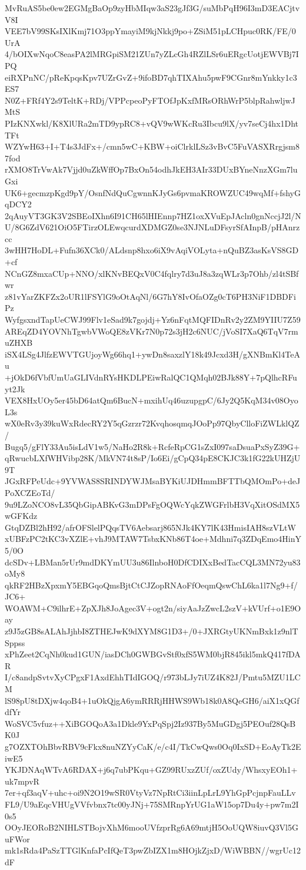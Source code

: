 MvRuAS5be0ew2EGMgBaOp9zyHbMIqw3aS23gJf3G/suMbPqH96I3mD3EACjtvV8I
VEE7bV99SKsIXlKmj71O3ppYmayiM9kjNkkj9po+ZSiM51pLCHpuc0RK/FE/0UrA
4/bOIXwNqoC8easPA2lMRGpiSM21ZUn7yZLcGh4RZlLSr6uERgcUotjEWVBj7IPQ
eiRXPnNC/pReKpqsKpv7UZrGvZ+9ifoBD7qhTIXAhu5pwF9CGnr8mYnkky1c3ES7
N0Z+FRf4Y2s9TeltK+RDj/VPPcpeoPyFTOfJpKxfMRsORhWrP5blpRahwljwJMtS
PIzKNXwkl/K8XlURa2mTD9ypRC8+vQV9wWKcRu3Ibcu9lX/yv7seCj4hx1DhtTFt
WZYwH63+I+T4s3JdFx+/cmn5wC+KBW+oiClrklLSz3vBvC5FuVASXRrgjsm87fod
rXMO8TrVwAk7Vjjd0uZkWffOp7BxOn54odhJkEH3AIr33DUxBYneNnzXGm7luGxi
UK6+gecmzpKgd9pY/OsnfNdQuCgwnnKJyGs6pvmaKROWZUC49wqMf+fshyGqDCY2
2qAuyVT3GK3V2SBEoIXhn6I91CH65lHIEnnp7HZ1oxXVuEpJAcln0gnNccjJ2l/N
U/8G6ZdV621OiO5FTirzOLEwqcurdXDMGZ0se3NJNLuDFsyrSfAInpB/pHAnrzcc
3wHH7HoDL+Fufn36XCk0/ALdsnp8hxo6iX9vAqiVOLyta+nQuBZ3asKsVS8GD+cf
NCnGZ8mxaCUp+NNO/xlKNvBEQxV0C4fqlry7d3uJ8a3zqWLr3p7Ohb/zl4tSBfwr
z81vYarZKFZx2oUR1lFSYlG9oOtAqNl/6G7hY8IvOfaOZg0cT6PH3NiF1DBDFiPz
WyfgsxndTapUeCWJ99Flv1eSad9k7gojdj+Yz6nFqtMQFIDnRv2y2ZM9YIIU7Z59
AREqZD4YOVNhTgwbVWoQE8zVKr7N0p72s3jH2c6NUC/jVoSI7XaQ6TqV7rmuZHXB
iSX4LSg4JlfzEWVTGUjoyWg66hq1+ywDn8saxzlY18k49Jcxd3H/gXNBmKl4TeAu
+jOkD6fVbfUmUaGLIVdnRYsHKDLPEiwRalQC1QMqh02BJk88Y+7pQlhcRFuyt2Jk
VEX8HxUOy5er45bD64atQm6BucN+mxihUq46uzupgpC/6Jy2Q5KqM34v08OyoL3s
wX0eRv3y39kuWxRdecRY2Y5qGzrzr72KvqhosqmqJOoPp97QbyClloFiZWLklQZ/
Bugq5/gFlY33Au5isLdV1w5/NaHo2R8k+RcfeRpCG1sZxI097saDsuaPxSyZ39G+
qRwucbLXfWHVibp28K/MkVN74t8sP/Io6Ei/gCpQ34pE8CKJC3k1fG22kUHZjU9T
JGxRFPeUdc+9YVWAS8SRINDYWJMsaBYKiUJDHmmBFTTbQMOmPo+deJPoXCZEoTd/
9u9LZoNCO8vL35QbGipABKvG3mDPsFgOQWcYqkZWGFrlbH3VqXitOSdMX5wGFKdz
GtqDZBl2hH92/afrOFSlelPQqsTV6Aebsarj865NJk4KY7lK43HmisIAH8szVLtW
xUBFzPC2tKC3vXZlE+vhJ9MTAW7TsbxKNb86T4oe+Mdhni7q3ZDqEmo4HinY5/0O
dcSDv+LBMan5rUr9mdDKYmUU3u86IlnboH0DfCDIXxBedTacCQL3MN72yu83oMy8
qkRF2HBzXpxmY5EBGqoQmsBjtCtCJZopRNAoFfOeqmQswChL6ka1l7Ng9+f/JC6+
WOAWM+C9ilhrE+ZpXJh8JoAgec3V+ogt2n/siyAaJzZwcL2szV+kVUrf+o1E9Oay
z9J5zGB8sALAhJjhbI8ZTHEJwK9dXYM8G1D3+/0+JXRGtyUKNmBxk1z9nlTSppss
xPhZeet2CqNh0kud1GUN/iasDCh0GWBGvStf0xfS5WM0bjR845ikl5mkQ417fDAR
I/c8andpSvtvXyCPgxF1AxdEhhTIdIGOQ/r973bLJy7iUZ4K82J/Pmtu5MZU1LCM
lS98pU8tDXjw4qoB4+1uOkQjgA6ymRRRjHHWS9Wb18k0A8QeGH6/aiX1xQGfdfYr
WoSVC5vfuz++XiBGOQoA3a1Dkle9YxPqSpj2Iz937By5MuGDgj5PEOuf28QsBK0J
g7OZXTOhBbvRBV9cFkx8nuNZYyCaK/e/c4I/TkCwQws0Oq0IxSD+EoAyTk2EiwE5
YKJDNAqWTvA6RDAX+j6q7ubPKqu+GZ99RUxzZUf/oxZUdy/WhsxyEOh1+uk7mpvR
7er+qf3aqV+uhc+oi9N2O19wSR0VtyVz7NpRtCi3iinLpLrL9YhGpPcjnpFauLLv
FL9/U9aEqcVHUgVVfvbnx7tc00yJNj+75SMRnpYrUG1aW15op7Du4y+pw7m2I0s5
OOyJEORoB2NIHLSTBojvXhM6mooUVfzprRg6A69mtjH5OoUQW8iuvQ3Vl5GuFWor
mk1sRda4PaSzTTGlKnfaPcIfQeT3pwZbIZX1m8HOjkZjxD/WiWBBN//wgrUc12dF
